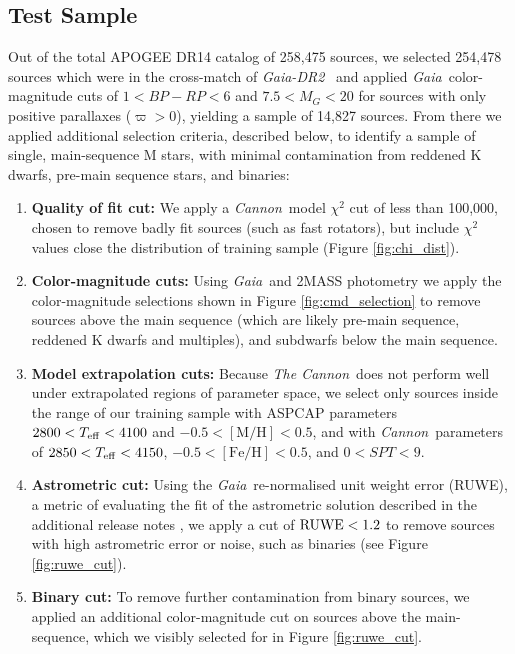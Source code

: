 \documentclass[twocolumn]{aastex62}
\newcommand{\thecannon}{\textsl{The Cannon}}
\newcommand{\cannon}{\textsl{Cannon}}
\newcommand{\gaia}{\textsl{Gaia}}
\newcommand{\drtwo}{\textsl{Gaia-DR2}}
\newcommand{\feh}{[{\mathrm{Fe}/\mathrm{H}}]}
\newcommand{\mh}{[{\mathrm{M}/\mathrm{H}}]}
\begin{document}
\subsection{Test Sample \label{subsec:test_selection}} 

Out of the total APOGEE DR14 catalog of 258,475 sources, we selected 254,478 sources which were in the cross-match of \drtwo\ \citep{Brown:2018} and applied \gaia\ color-magnitude cuts of $1<BP-RP<6$ and $7.5<M_G<20$ for sources with only positive parallaxes ($\varpi>0$), yielding a sample of 14,827 sources. From there we applied additional selection criteria, described below, to identify a sample of single, main-sequence M stars, with minimal contamination from reddened K dwarfs, pre-main sequence stars, and binaries:

\begin{enumerate}
\item \textbf{Quality of fit cut:} We apply a \cannon\ model $\chi^2$ cut of less than 100,000, chosen to remove badly fit sources (such as fast rotators), but include $\chi^2$ values close \color{red}{\bf to }\color{black} the distribution of training sample (Figure \ref{fig:chi_dist}).

\item \textbf{Color-magnitude cuts:} Using \gaia\ and 2MASS photometry we apply the \color{red}{\bf additional }\color{black} color-magnitude selections shown in Figure \ref{fig:cmd_selection} to remove sources above the main sequence (which are likely pre-main sequence, reddened K dwarfs and\color{red}{\bf /or }\color{black} multiples), and subdwarfs below the main sequence.

\item \textbf{Model extrapolation cuts:} Because \thecannon\ does not perform well under extrapolated regions of parameter space, we select only sources inside the range of our training sample with ASPCAP parameters $2800<T_{\rm eff}<4100$ and $-0.5<\mh<0.5$, and with \cannon\ parameters of $2850<T_{\rm eff}<4150$, $-0.5<\feh<0.5$, and $0<SPT<9$.

\item \textbf{Astrometric cut:} Using the \gaia\ re-normalised unit weight error (RUWE), a metric of evaluating the fit of the astrometric solution described in the additional release notes \citep{Lindegren:2018}, we apply a cut of ${\rm RUWE}<1.2$ to remove sources with high astrometric error or noise, such as binaries (see Figure \ref{fig:ruwe_cut}).

\item \textbf{Binary cut:} To remove further contamination from binary sources, we applied an additional color-magnitude cut on sources above the main-sequence, which we visibly selected for in Figure \ref{fig:ruwe_cut}.

\end{enumerate}
\end{document}
